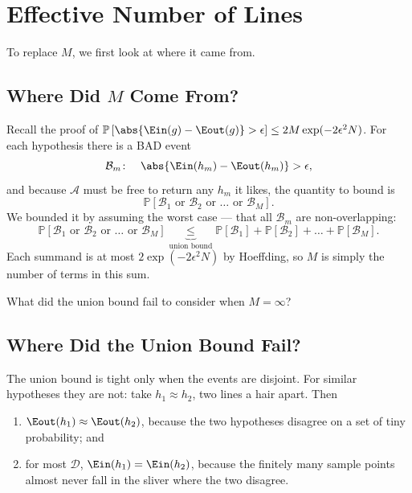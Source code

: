 \section{Effective Number of Lines}\label{sec:effective-lines}


To replace \(M\), we first look at where it came from.

\subsection{Where Did \texorpdfstring{\(M\)}{M} Come From?}

Recall the proof of
\(\mathbb{P}\left[ \abs{\Ein(g) - \Eout(g)} > \epsilon \right]
\le 2 M \exp(-2\epsilon^2 N)\). For each hypothesis there is a BAD event
\[
    \mathcal{B}_m \colon \quad \abs{\Ein(h_m) - \Eout(h_m)} > \epsilon ,
\]
and because \(\mathcal{A}\) must be free to return any \(h_m\) it likes, the
quantity to bound is
\[
    \mathbb{P}\left[ \mathcal{B}_1 \text{ or } \mathcal{B}_2 \text{ or }
    \dots \text{ or } \mathcal{B}_M \right] .
\]
We bounded it by assuming the worst case --- that all \(\mathcal{B}_m\) are
non-overlapping:
\[
    \mathbb{P}\left[ \mathcal{B}_1 \text{ or } \mathcal{B}_2 \text{ or }
    \dots \text{ or } \mathcal{B}_M \right]
    \underbrace{\le}_{\text{union bound}}
    \mathbb{P}\left[ \mathcal{B}_1 \right] +
    \mathbb{P}\left[ \mathcal{B}_2 \right] + \dots +
    \mathbb{P}\left[ \mathcal{B}_M \right] .
\]
Each summand is at most \(2\exp(-2\epsilon^2 N)\) by Hoeffding, so \(M\) is
simply the number of terms in this sum.

\begin{question}\label{q:union-fail}
    What did the union bound fail to consider when \(M = \infty\)?
\end{question}

\subsection{Where Did the Union Bound Fail?}

The union bound is tight only when the events are disjoint. For similar
hypotheses they are not: take \(h_1 \approx h_2\), two lines a hair apart.
Then

\begin{enumerate}
    \item \(\Eout(h_1) \approx \Eout(h_2)\), because the two hypotheses disagree
        on a set of tiny probability; and
    \item for most \(\mathcal{D}\), \(\Ein(h_1) = \Ein(h_2)\), because the
        finitely many sample points almost never fall in the sliver where the
        two disagree.
\end{enumerate}

